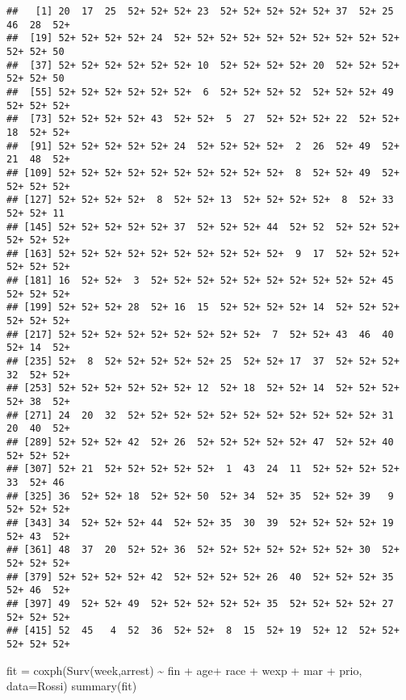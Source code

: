 \documentclass[
]{article}
\newenvironment{Shaded}{\begin{snugshade}}{\end{snugshade}}
\newcommand{\AttributeTok}[1]{\textcolor[rgb]{0.77,0.63,0.00}{#1}}
\newcommand{\FunctionTok}[1]{\textcolor[rgb]{0.00,0.00,0.00}{#1}}
\newcommand{\NormalTok}[1]{#1}
\newcommand{\OtherTok}[1]{\textcolor[rgb]{0.56,0.35,0.01}{#1}}
\newcommand{\SpecialCharTok}[1]{\textcolor[rgb]{0.00,0.00,0.00}{#1}}
\begin{document}
\begin{verbatim}
##   [1] 20  17  25  52+ 52+ 52+ 23  52+ 52+ 52+ 52+ 52+ 37  52+ 25  46  28  52+
##  [19] 52+ 52+ 52+ 52+ 24  52+ 52+ 52+ 52+ 52+ 52+ 52+ 52+ 52+ 52+ 52+ 52+ 50 
##  [37] 52+ 52+ 52+ 52+ 52+ 52+ 10  52+ 52+ 52+ 52+ 20  52+ 52+ 52+ 52+ 52+ 50 
##  [55] 52+ 52+ 52+ 52+ 52+ 52+  6  52+ 52+ 52+ 52  52+ 52+ 52+ 49  52+ 52+ 52+
##  [73] 52+ 52+ 52+ 52+ 43  52+ 52+  5  27  52+ 52+ 52+ 22  52+ 52+ 18  52+ 52+
##  [91] 52+ 52+ 52+ 52+ 52+ 24  52+ 52+ 52+ 52+  2  26  52+ 49  52+ 21  48  52+
## [109] 52+ 52+ 52+ 52+ 52+ 52+ 52+ 52+ 52+ 52+  8  52+ 52+ 49  52+ 52+ 52+ 52+
## [127] 52+ 52+ 52+ 52+  8  52+ 52+ 13  52+ 52+ 52+ 52+  8  52+ 33  52+ 52+ 11 
## [145] 52+ 52+ 52+ 52+ 52+ 37  52+ 52+ 52+ 44  52+ 52  52+ 52+ 52+ 52+ 52+ 52+
## [163] 52+ 52+ 52+ 52+ 52+ 52+ 52+ 52+ 52+ 52+  9  17  52+ 52+ 52+ 52+ 52+ 52+
## [181] 16  52+ 52+  3  52+ 52+ 52+ 52+ 52+ 52+ 52+ 52+ 52+ 52+ 45  52+ 52+ 52+
## [199] 52+ 52+ 52+ 28  52+ 16  15  52+ 52+ 52+ 52+ 14  52+ 52+ 52+ 52+ 52+ 52+
## [217] 52+ 52+ 52+ 52+ 52+ 52+ 52+ 52+ 52+  7  52+ 52+ 43  46  40  52+ 14  52+
## [235] 52+  8  52+ 52+ 52+ 52+ 52+ 25  52+ 52+ 17  37  52+ 52+ 52+ 32  52+ 52+
## [253] 52+ 52+ 52+ 52+ 52+ 52+ 12  52+ 18  52+ 52+ 14  52+ 52+ 52+ 52+ 38  52+
## [271] 24  20  32  52+ 52+ 52+ 52+ 52+ 52+ 52+ 52+ 52+ 52+ 52+ 31  20  40  52+
## [289] 52+ 52+ 52+ 42  52+ 26  52+ 52+ 52+ 52+ 52+ 47  52+ 52+ 40  52+ 52+ 52+
## [307] 52+ 21  52+ 52+ 52+ 52+ 52+  1  43  24  11  52+ 52+ 52+ 52+ 33  52+ 46 
## [325] 36  52+ 52+ 18  52+ 52+ 50  52+ 34  52+ 35  52+ 52+ 39   9  52+ 52+ 52+
## [343] 34  52+ 52+ 52+ 44  52+ 52+ 35  30  39  52+ 52+ 52+ 52+ 19  52+ 43  52+
## [361] 48  37  20  52+ 52+ 36  52+ 52+ 52+ 52+ 52+ 52+ 52+ 30  52+ 52+ 52+ 52+
## [379] 52+ 52+ 52+ 52+ 42  52+ 52+ 52+ 52+ 26  40  52+ 52+ 52+ 35  52+ 46  52+
## [397] 49  52+ 52+ 49  52+ 52+ 52+ 52+ 52+ 35  52+ 52+ 52+ 52+ 27  52+ 52+ 52+
## [415] 52  45   4  52  36  52+ 52+  8  15  52+ 19  52+ 12  52+ 52+ 52+ 52+ 52+
\end{verbatim}

\begin{Shaded}
\begin{Highlighting}[]
\NormalTok{fit }\OtherTok{=} \FunctionTok{coxph}\NormalTok{(}\FunctionTok{Surv}\NormalTok{(week,arrest) }\SpecialCharTok{\textasciitilde{}}\NormalTok{ fin }\SpecialCharTok{+}\NormalTok{ age}\SpecialCharTok{+}\NormalTok{ race }\SpecialCharTok{+}\NormalTok{ wexp }\SpecialCharTok{+}\NormalTok{ mar }\SpecialCharTok{+}\NormalTok{ prio, }
            \AttributeTok{data=}\NormalTok{Rossi)}
\FunctionTok{summary}\NormalTok{(fit)}
\end{Highlighting}
\end{Shaded}
\end{document}
